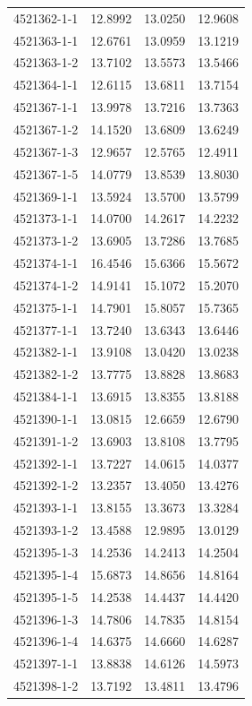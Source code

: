 \begin{longtable}{lrrr}
4521362-1-1 & 12.8992 & 13.0250 & 12.9608 \\
4521363-1-1 & 12.6761 & 13.0959 & 13.1219 \\
4521363-1-2 & 13.7102 & 13.5573 & 13.5466 \\
4521364-1-1 & 12.6115 & 13.6811 & 13.7154 \\
4521367-1-1 & 13.9978 & 13.7216 & 13.7363 \\
4521367-1-2 & 14.1520 & 13.6809 & 13.6249 \\
4521367-1-3 & 12.9657 & 12.5765 & 12.4911 \\
4521367-1-5 & 14.0779 & 13.8539 & 13.8030 \\
4521369-1-1 & 13.5924 & 13.5700 & 13.5799 \\
4521373-1-1 & 14.0700 & 14.2617 & 14.2232 \\
4521373-1-2 & 13.6905 & 13.7286 & 13.7685 \\
4521374-1-1 & 16.4546 & 15.6366 & 15.5672 \\
4521374-1-2 & 14.9141 & 15.1072 & 15.2070 \\
4521375-1-1 & 14.7901 & 15.8057 & 15.7365 \\
4521377-1-1 & 13.7240 & 13.6343 & 13.6446 \\
4521382-1-1 & 13.9108 & 13.0420 & 13.0238 \\
4521382-1-2 & 13.7775 & 13.8828 & 13.8683 \\
4521384-1-1 & 13.6915 & 13.8355 & 13.8188 \\
4521390-1-1 & 13.0815 & 12.6659 & 12.6790 \\
4521391-1-2 & 13.6903 & 13.8108 & 13.7795 \\
4521392-1-1 & 13.7227 & 14.0615 & 14.0377 \\
4521392-1-2 & 13.2357 & 13.4050 & 13.4276 \\
4521393-1-1 & 13.8155 & 13.3673 & 13.3284 \\
4521393-1-2 & 13.4588 & 12.9895 & 13.0129 \\
4521395-1-3 & 14.2536 & 14.2413 & 14.2504 \\
4521395-1-4 & 15.6873 & 14.8656 & 14.8164 \\
4521395-1-5 & 14.2538 & 14.4437 & 14.4420 \\
4521396-1-3 & 14.7806 & 14.7835 & 14.8154 \\
4521396-1-4 & 14.6375 & 14.6660 & 14.6287 \\
4521397-1-1 & 13.8838 & 14.6126 & 14.5973 \\
4521398-1-2 & 13.7192 & 13.4811 & 13.4796 \\

\end{longtable}
